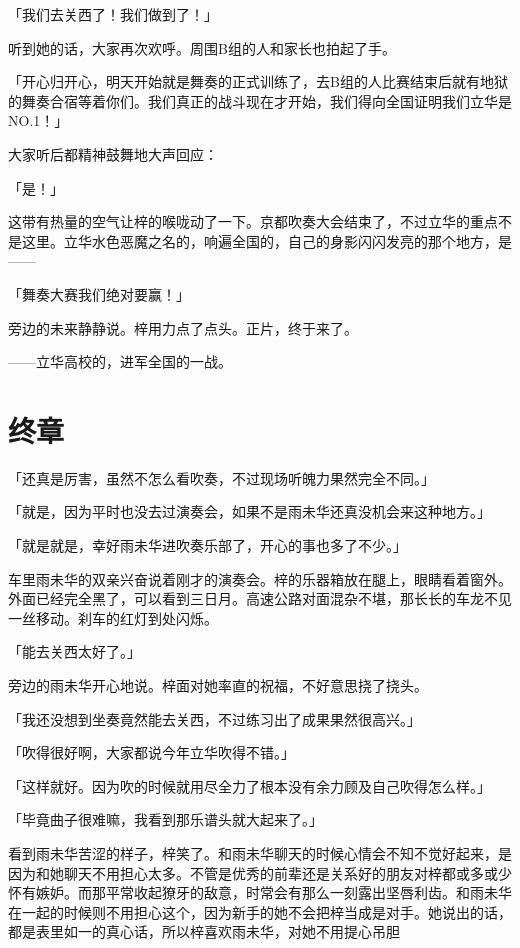 \documentclass[UTF8]{ctexart}
\begin{document}
    「我们去关西了！我们做到了！」

    听到她的话，大家再次欢呼。周围B组的人和家长也拍起了手。

    「开心归开心，明天开始就是舞奏的正式训练了，去B组的人比赛结束后就有地狱的舞奏合宿等着你们。我们真正的战斗现在才开始，我们得向全国证明我们立华是NO.1！」

    大家听后都精神鼓舞地大声回应：

    「是！」

    这带有热量的空气让梓的喉咙动了一下。京都吹奏大会结束了，不过立华的重点不是这里。立华水色恶魔之名的，响遍全国的，自己的身影闪闪发亮的那个地方，是——

    「舞奏大赛我们绝对要赢！」

    旁边的未来静静说。梓用力点了点头。正片，终于来了。

    ——立华高校的，进军全国的一战。
    \setcounter{secnumdepth}{-2}
    \section{终章}
    「还真是厉害，虽然不怎么看吹奏，不过现场听魄力果然完全不同。」

    「就是，因为平时也没去过演奏会，如果不是雨未华还真没机会来这种地方。」

    「就是就是，幸好雨未华进吹奏乐部了，开心的事也多了不少。」

    车里雨未华的双亲兴奋说着刚才的演奏会。梓的乐器箱放在腿上，眼睛看着窗外。外面已经完全黑了，可以看到三日月。高速公路对面混杂不堪，那长长的车龙不见一丝移动。刹车的红灯到处闪烁。

    「能去关西太好了。」

    旁边的雨未华开心地说。梓面对她率直的祝福，不好意思挠了挠头。

    「我还没想到坐奏竟然能去关西，不过练习出了成果果然很高兴。」

    「吹得很好啊，大家都说今年立华吹得不错。」

    「这样就好。因为吹的时候就用尽全力了根本没有余力顾及自己吹得怎么样。」

    「毕竟曲子很难嘛，我看到那乐谱头就大起来了。」

    看到雨未华苦涩的样子，梓笑了。和雨未华聊天的时候心情会不知不觉好起来，是因为和她聊天不用担心太多。不管是优秀的前辈还是关系好的朋友对梓都或多或少怀有嫉妒。而那平常收起獠牙的敌意，时常会有那么一刻露出坚唇利齿。和雨未华在一起的时候则不用担心这个，因为新手的她不会把梓当成是对手。她说出的话，都是表里如一的真心话，所以梓喜欢雨未华，对她不用提心吊胆
\end{document}
